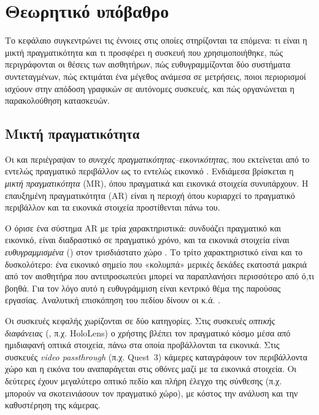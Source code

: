 \chapter{Θεωρητικό υπόβαθρο}
\label{ch:background}

Το κεφάλαιο συγκεντρώνει τις έννοιες στις οποίες στηρίζονται τα επόμενα: τι είναι η μικτή πραγματικότητα και τι προσφέρει η συσκευή που χρησιμοποιήθηκε, πώς περιγράφονται οι θέσεις των αισθητήρων, πώς ευθυγραμμίζονται δύο συστήματα συντεταγμένων, πώς εκτιμάται ένα μέγεθος ανάμεσα σε μετρήσεις, ποιοι περιορισμοί ισχύουν στην απόδοση γραφικών σε αυτόνομες συσκευές, και πώς οργανώνεται η παρακολούθηση κατασκευών.

\section{Μικτή πραγματικότητα}
\label{sec:bg-mr}

Οι  και  περιέγραψαν το \emph{συνεχές πραγματικότητας--εικονικότητας}, που εκτείνεται από το εντελώς πραγματικό περιβάλλον ως το εντελώς εικονικό \cite{milgram1994taxonomy}. Ενδιάμεσα βρίσκεται η \emph{μικτή πραγματικότητα} (MR), όπου πραγματικά και εικονικά στοιχεία συνυπάρχουν. Η επαυξημένη πραγματικότητα (AR) είναι η περιοχή όπου κυριαρχεί το πραγματικό περιβάλλον και τα εικονικά στοιχεία προστίθενται πάνω του.

Ο  όρισε ένα σύστημα AR με τρία χαρακτηριστικά: συνδυάζει πραγματικό και εικονικό, είναι διαδραστικό σε πραγματικό χρόνο, και τα εικονικά στοιχεία είναι \emph{ευθυγραμμισμένα} () στον τρισδιάστατο χώρο \cite{azuma1997survey}. Το τρίτο χαρακτηριστικό είναι και το δυσκολότερο: ένα εικονικό σημείο που «κολυμπά» μερικές δεκάδες εκατοστά μακριά από τον αισθητήρα που αντιπροσωπεύει μπορεί να παραπλανήσει περισσότερο από ό,τι βοηθά. Για τον λόγο αυτό η ευθυγράμμιση είναι κεντρικό θέμα της παρούσας εργασίας. Αναλυτική επισκόπηση του πεδίου δίνουν οι  κ.ά. \cite{billinghurst2015survey}.

Οι συσκευές κεφαλής χωρίζονται σε δύο κατηγορίες. Στις συσκευές \emph{οπτικής διαφάνειας} (, π.χ. HoloLens) ο χρήστης βλέπει τον πραγματικό κόσμο μέσα από ημιδιαφανή οπτικά στοιχεία, πάνω στα οποία προβάλλονται τα εικονικά. Στις συσκευές \emph{video passthrough} (π.χ. Quest~3) κάμερες καταγράφουν τον περιβάλλοντα χώρο και η εικόνα του αναπαράγεται στις οθόνες μαζί με τα εικονικά στοιχεία. Οι δεύτερες έχουν μεγαλύτερο οπτικό πεδίο και πλήρη έλεγχο της σύνθεσης (π.χ. μπορούν να σκοτεινιάσουν τον πραγματικό χώρο), με κόστος την ανάλυση και την καθυστέρηση της κάμερας.

